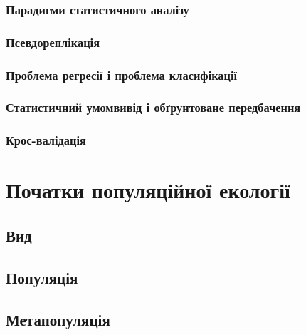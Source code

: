 \documentclass[
  11pt,
]{book}
\begin{document}
\subsection{Парадигми статистичного аналізу}\label{paradigms}

\subsection{Псевдореплікація}\label{ux43fux441ux435ux432ux434ux43eux440ux435ux43fux43bux456ux43aux430ux446ux456ux44f}

\subsection{Проблема регресії і проблема класифікації}\label{ux43fux440ux43eux431ux43bux435ux43cux430-ux440ux435ux433ux440ux435ux441ux456ux457-ux456-ux43fux440ux43eux431ux43bux435ux43cux430-ux43aux43bux430ux441ux438ux444ux456ux43aux430ux446ux456ux457}

\subsection{Статистичний умомвивід і обґрунтоване передбачення}\label{ux441ux442ux430ux442ux438ux441ux442ux438ux447ux43dux438ux439-ux443ux43cux43eux43cux432ux438ux432ux456ux434-ux456-ux43eux431ux491ux440ux443ux43dux442ux43eux432ux430ux43dux435-ux43fux435ux440ux435ux434ux431ux430ux447ux435ux43dux43dux44f}

\subsection{Крос-валідація}\label{ux43aux440ux43eux441-ux432ux430ux43bux456ux434ux430ux446ux456ux44f}

\chapter{Початки популяційної екології}\label{popeco}

\section{Вид}\label{species}

\section{Популяція}\label{population}

\section{Метапопуляція}\label{metapopulation}
\end{document}
